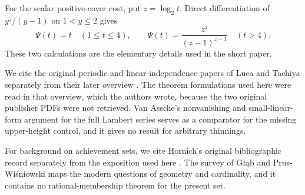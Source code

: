 \documentclass[11pt]{article}
\theoremstyle{plain}
\theoremstyle{definition}
\theoremstyle{remark}
\begin{document}
For the scalar positive-cover cost, put $z=\log_2t$.  Direct differentiation
of $y^z/(y-1)$ on $1<y\le2$ gives
\[
 \Psi(t)=t\quad(1\le t\le4),\qquad
 \Psi(t)=\frac{z^z}{(z-1)^{z-1}}\quad(t>4).
\]
These two calculations are the elementary details used in the
short paper.

We cite the original periodic and linear-independence papers of Luca and Tachiya
separately from their later overview
\cite{lucatachiya2014periodic,lucatachiya2014independence,lucatachiya2017}.
The theorem formulations used here were read in that overview, which the
authors wrote, because the two original publisher PDFs were not retrieved.  Van Assche's nonvanishing and
small-linear-form argument for the full Lambert series
\cite[Lemma~1 and (34)--(35)]{vanassche2001} serves as a comparator for the missing
upper-height control, and it gives no result for arbitrary thinnings.

For background on achievement sets, we cite Hornich's original bibliographic record
\cite{hornich1941} separately from the exposition used here
\cite{nitecki2013}.  The survey of G\l\k{a}b and Prus-Wi\'sniowski
\cite{glabprus2025} maps the modern questions of geometry and cardinality,
and it contains no rational-membership theorem for the present set.

\begingroup
\newcommand{\mword}[4]{\href{https://github.com/wcook04/plectis-erdos/blob/99f4bf47422abbd8757cbb22b50ba079d764d3a7/#1\#L#2}{#4}}
\newcommand{\lword}[4]{\href{https://github.com/wcook04/plectis-erdos/blob/99f4bf47422abbd8757cbb22b50ba079d764d3a7/ErdosProblems/#1\#L#2}{#4}}
\end{document}
